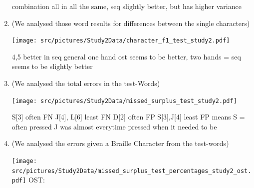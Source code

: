 \begin{enumerate}
combination all in all the same, seq slightly better, but has higher variance


    \item (We analysed those word results for differences between the single characters)

    \centering
    \texttt{[image: src/pictures/Study2Data/character\_f1\_test\_study2.pdf]}

\begin{table}[ht]
\caption{Results of the \gls{mwu} for significance grouped by the different Braille characters during learning for the different Encodings with Cohen's d.}
\label{table:learning_significance_results_secondStudy_nonPar}
\end{table}

4,5 better in seq
general one hand ost seems to be better, two hands = seq seems to be slightly better


    \item (We analysed the total errors in the test-Words)

    \centering
    \texttt{[image: src/pictures/Study2Data/missed\_surplus\_test\_study2.pdf]}


S[3] often FN
J[4], L[6] least FN
D[2] often FP
S[3],J[4] least FP
means S = often pressed
J was almost everytime pressed when it needed to be

    \item (We analysed the errors given a Braille Character from the test-words)

        \centering
        \texttt{[image: src/pictures/Study2Data/missed\_surplus\_test\_percentages\_study2\_ost.pdf]}
OST:


\end{enumerate}
